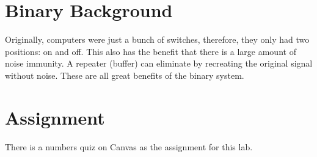 \section{Binary Background}
Originally, computers were just a bunch of switches, therefore, they only had two positions: on and off. 
This also has the benefit that there is a large amount of noise immunity. A repeater (buffer) can eliminate 
by recreating the original signal without noise. These are all great benefits of the binary system.

\section{Assignment}
There is a numbers quiz on Canvas as the assignment for this lab.